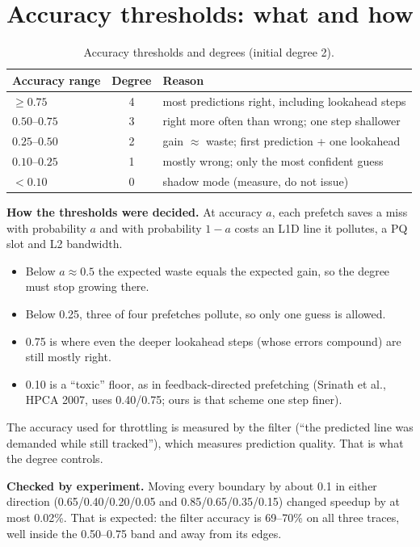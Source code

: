\documentclass[12pt]{report}
\begin{document}
\section{Accuracy thresholds: what and how}

\begin{table}[H]\centering
\begin{tabular}{l c l}
\toprule
Accuracy range & Degree & Reason \\
\midrule
$\geq 0.75$ & 4 & most predictions right, including lookahead steps \\
$0.50$--$0.75$ & 3 & right more often than wrong; one step shallower \\
$0.25$--$0.50$ & 2 & gain $\approx$ waste; first prediction + one lookahead \\
$0.10$--$0.25$ & 1 & mostly wrong; only the most confident guess \\
$< 0.10$ & 0 & shadow mode (measure, do not issue) \\
\bottomrule
\end{tabular}
\caption{Accuracy thresholds and degrees (initial degree 2).}
\label{tab:deg}
\end{table}

\textbf{How the thresholds were decided.} At accuracy $a$, each prefetch saves
a miss with probability $a$ and with probability $1-a$ costs an L1D line it
pollutes, a PQ slot and L2 bandwidth.
\begin{itemize}[nosep]
  \item Below $a\approx0.5$ the expected waste equals the expected gain, so
        the degree must stop growing there.
  \item Below 0.25, three of four prefetches pollute, so only one guess is
        allowed.
  \item 0.75 is where even the deeper lookahead steps (whose errors compound)
        are still mostly right.
  \item 0.10 is a ``toxic'' floor, as in feedback-directed prefetching
        (Srinath et al., HPCA 2007, uses 0.40/0.75; ours is that scheme one
        step finer).
\end{itemize}
The accuracy used for throttling is measured by the filter (``the predicted
line was demanded while still tracked''), which measures prediction quality.
That is what the degree controls.

\textbf{Checked by experiment.} Moving every boundary by about 0.1 in either
direction (0.65/0.40/0.20/0.05 and 0.85/0.65/0.35/0.15) changed speedup by at
most 0.02\%. That is expected: the filter accuracy is 69--70\% on all three
traces, well inside the 0.50--0.75 band and away from its edges.
\end{document}
